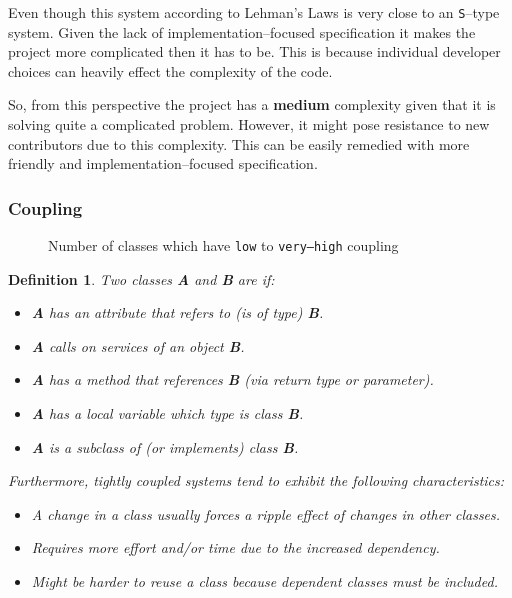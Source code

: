 \documentclass[12pt]{article}
\DeclareRobustCommand{\ul}[1]{%
	\uline{\phantom{#1}}%
	\llap{\contour{white}{#1}}%
}
\newtheorem*{definition}{Definition}
\begin{document}
Even though this system according to Lehman's Laws is very close
to an \texttt{S}--type system. Given the lack of
implementation--focused specification it makes the project more
complicated then it has to be. This is because individual
developer choices can heavily effect the complexity of the code.

So, from this perspective the project has a \textbf{medium}
complexity given that it is solving quite a complicated problem.
However, it might pose resistance to new contributors due to this
complexity. This can be easily remedied with more friendly and
implementation--focused specification.

\subsubsection{Coupling}

\begin{figure}[H]
    \centering
    \caption{Number of classes which have \texttt{low} to
    \texttt{very--high} coupling}
    \label{coupling-diag}
\end{figure}

\begin{definition}
    Two classes \textbf{A} and \textbf{B} are \ul{coupled} if:
    \begin{itemize}
        \item \textbf{A} has an attribute that refers to (is of type)
            \textbf{B}.
        \item \textbf{A} calls on services of an object
            \textbf{B}.
        \item \textbf{A} has a method that references \textbf{B}
            (via return type or parameter).
        \item \textbf{A} has a local variable which type is
            class \textbf{B}.
        \item \textbf{A} is a subclass of (or implements) class
            \textbf{B}.
    \end{itemize}

    Furthermore, tightly coupled systems tend to exhibit the
    following characteristics:
    \begin{itemize}
        \item A change in a class usually forces a ripple effect
            of changes in other classes.
        \item Requires more effort and/or time due to the
            increased dependency.
        \item Might be harder to reuse a class because dependent
            classes must be included.
    \end{itemize}
\end{definition}
\end{document}

